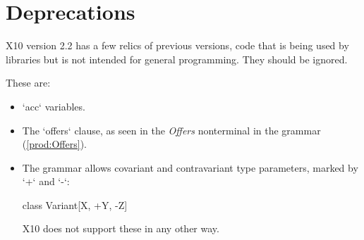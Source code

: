 \chapter{Deprecations}

X10 version 2.2 has a few relics of previous versions, code that is being used
by libraries but is not intended for general programming.    They should be
ignored.

These are: 

\begin{itemize}

\item \xcd`acc` variables. 

\item The \xcd`offers` clause, as seen in the {\it Offers} nonterminal in the
      grammar (\ref{prod:Offers}).

\item The grammar allows covariant and contravariant type parameters, marked
      by \xcd`+` and \xcd`-`: 
\begin{xtenmath}
class Variant[X, +Y, -Z] {}
\end{xtenmath}
      X10 does not support these in any other way.

\end{itemize}
